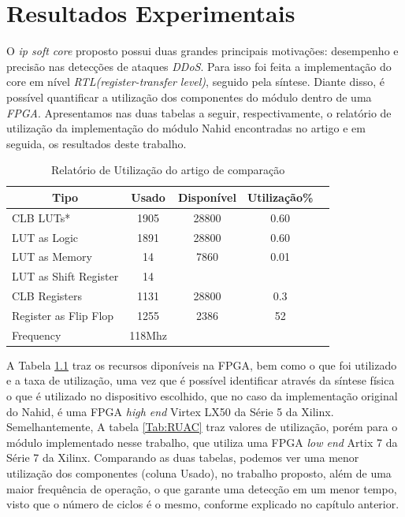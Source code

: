 \chapter{Resultados Experimentais}\label{CAP4}

O \textit{ip soft core} proposto possui duas grandes principais motivações: desempenho e precisão nas detecções de ataques \textit{DDoS}. Para isso foi feita a implementação do core em nível \textit{RTL(register-transfer level)}, seguido pela síntese. Diante disso, é possível quantificar a utilização dos componentes do módulo dentro de uma \textit{FPGA}. Apresentamos nas duas tabelas a seguir, respectivamente, o relatório de utilização da implementação do módulo Nahid encontradas no  artigo \cite{HOQUE201748} e em seguida, os resultados deste trabalho. 
\begin{table}[!htb]
	\centering
	\caption{Relatório de Utilização do artigo de comparação}
	\label{Tab:RUP}
	\begin{tabular}{lcccc}
		\hline
		\multicolumn{1}{c}{Tipo}&\multicolumn{1}{c}{Usado }&\multicolumn{1}{c}{Disponível}&\multicolumn{1}{c}{Utilização\%} \\ \midrule 
		
		CLB LUTs*&  1905  & 28800 & 0.60  \\   \midrule
		LUT as Logic & 1891  & 28800 &  0.60  \\  \midrule
		LUT as Memory &  14  & 7860 &  0.01  \\  \midrule
		LUT as Shift Register & 14  &  &   \\  \midrule
		CLB Registers  & 1131  & 28800 & 0.3  \\  \midrule
		Register as Flip Flop & 1255  & 2386  & 52    \\  \midrule
		Frequency &  118Mhz 
	\end{tabular}
\end{table}

A Tabela \ref{Tab:RUP} traz os recursos diponíveis na FPGA, bem como o que foi utilizado e a taxa de utilização, uma vez que é possível identificar através da síntese física o que é utilizado no dispositivo escolhido, que no caso da implementação original do Nahid, é uma FPGA \textit{high end} Virtex LX50 da Série 5 da Xilinx. Semelhantemente, A tabela \ref{Tab:RUAC} traz valores de utilização, porém para o módulo implementado nesse trabalho, que utiliza uma FPGA \textit{low end} Artix 7 da Série 7 da Xilinx. Comparando as duas tabelas, podemos ver uma menor utilização dos componentes (coluna Usado), no trabalho proposto, além de uma maior frequência de operação, o que garante uma detecção em um menor tempo, visto que o número de ciclos é o mesmo, conforme explicado no capítulo anterior.


